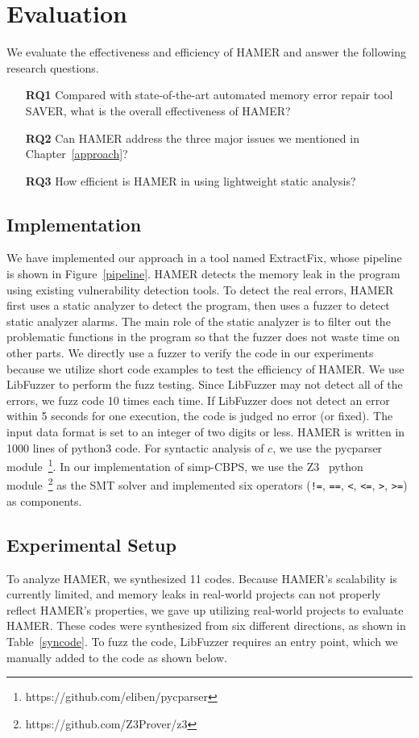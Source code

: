 \documentclass[a4paper,11pt,oneside,openany]{book}
\begin{document}

\chapter{Evaluation}
We evaluate the effectiveness and efficiency of HAMER and answer the following research questions.

\begin{itemize}
\item[\textbf{RQ1}] Compared with state-of-the-art automated memory error repair tool SAVER, what is the overall effectiveness of HAMER?
\item[\textbf{RQ2}] Can HAMER address the three major issues we mentioned in Chapter~\ref{approach}? 
\item[\textbf{RQ3}] How efficient is HAMER in using lightweight static analysis?
\end{itemize}

\section{Implementation}
We have implemented our approach in a tool named ExtractFix, whose pipeline is shown in Figure~\ref{pipeline}. HAMER detects the memory leak in the program using existing vulnerability detection tools. To detect the real errors, HAMER first uses a static analyzer to detect the program, then uses a fuzzer to detect static analyzer alarms. The main role of the static analyzer is to filter out the problematic functions in the program so that the fuzzer does not waste time on other parts. We directly use a fuzzer to verify the code in our experiments because we utilize short code examples to test the efficiency of HAMER. We use LibFuzzer to perform the fuzz testing. Since LibFuzzer may not detect all of the errors, we fuzz code 10 times each time. If LibFuzzer does not detect an error within 5 seconds for one execution, the code is judged no error (or fixed). The input data format is set to an integer of two digits or less. HAMER is written in 1000 lines of python3 code. For syntactic analysis of $c$, we use the pycparser module~\footnote{https://github.com/eliben/pycparser}. In our implementation of simp-CBPS, we use the Z3~\cite{z3} python module~\footnote{https://github.com/Z3Prover/z3} as the SMT solver and implemented six operators (\verb|!=|, \verb|==|, \verb|<|, \verb|<=|, \verb|>|, \verb|>=|) as components. 

\section{Experimental Setup}
To analyze HAMER, we synthesized 11 codes. Because HAMER's scalability is currently limited, and memory leaks in real-world projects can not properly reflect HAMER's properties, we gave up utilizing real-world projects to evaluate HAMER. These codes were synthesized from six different directions, as shown in Table~\ref{syncode}. To fuzz the code, LibFuzzer requires an entry point, which we manually added to the code as shown below. 
\end{document}
